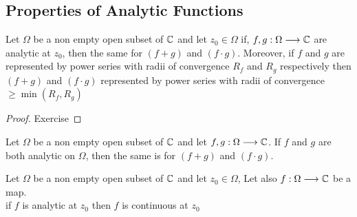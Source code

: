   \subsection{Properties of Analytic Functions}
  \begin{proposition}[]
  Let $\Omega  $ be a non empty open subset of $\mathbb{C}  $ and let $z_0 \in   \Omega  $ if, 
  $ f,g : \Omega  \longrightarrow \mathbb{C}  $ are analytic at $z_0 $, then the same for $(f+g)  $ and 
  $(f \cdot g)  $. Moreover, if $f  $ and $g $ are represented by power series with radii of convergence $R_{f} $ and
  $R_{g} $ respectively then $(f+g)  $ and $(f \cdot  g)  $ represented by power series 
  with radii of convergence $ \geq \min (R_{f}, R_{g})  $ 
  \end{proposition}
  \begin{proof}
  Exercise
  \end{proof}
  \begin{corollary}[]
    Let $ \Omega  $ be a non empty open subset of $\mathbb{C}  $ and let $ f,g : \Omega  \longrightarrow \mathbb{C} $. If $f $ 
    and $g $ are both analytic on $\Omega  $, then the same is for $(f + g)  $ 
    and $(f \cdot g)$. 
  \end{corollary}
  \begin{proposition}
    Let $\Omega  $ be a non empty open subset of $\mathbb{C}  $ and let $z_0 \in  \Omega  $,
    Let also $ f : \Omega  \longrightarrow \mathbb{C}  $ be a map. \\
    if $f $ is analytic at $z_0 $ then $f $ is continuous at $z_0 $ 
  \end{proposition}
